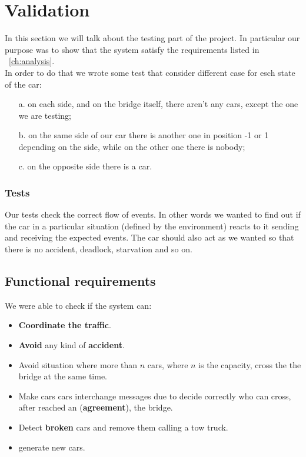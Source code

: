 \chapter{Validation}\label{ch:validation}
In this section we will talk about the testing part of the project. In particular our purpose was to 
show that the system satisfy the requirements listed in ~\ref{ch:analysis}. \\
In order to do that we wrote some test that consider different case for esch state of the car:
\begin{itemize}
    \item [a.] on each side, and on the bridge itself, there aren't any cars, except the one we are testing;
    \item [b.] on the same side of our car there is another one in position -1 or 1 depending on the side, 
    while on the other one there is nobody;
    \item [c.] on the opposite side there is a car.
\end{itemize}

\subsection{Tests}
Our tests check the correct flow of events. In other words we wanted to find out if the car in a 
particular situation (defined by the environment) reacts to it sending and receiving the expected
events. The car should also act as we wanted so that there is no accident, deadlock, starvation and so on.

\section{Functional requirements}

We were able to check if the system can:
\begin{itemize}
    \item \textbf{Coordinate the traffic}.
    \item \textbf{Avoid} any kind of \textbf{accident}.
    \item Avoid situation where more than $n$ cars, where $n$ is the capacity, cross the the bridge at 
    the same time.
    \item Make cars cars interchange messages due to decide correctly who can cross, after reached an
    (\textbf{agreement}), the bridge.
    \item Detect \textbf{broken} cars and remove them calling a tow truck.
    \item generate new cars.
\end{itemize}


